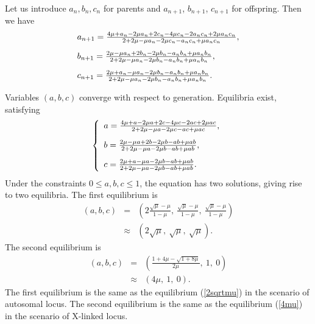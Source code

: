 \documentclass[referee,sn-basic]{sn-jnl}%
\theoremstyle{thmstyleone}%
\theoremstyle{thmstyletwo}%
\theoremstyle{thmstylethree}%
\begin{document}
 Let us introduce $a_n,b_n,c_n$ for parents and $a_{n+1}$, $b_{n+1}$, $c_{n+1}$ for offspring.
Then we have
{\begin{equation}\label{np1} 
 \begin{array}{lll}
\vspace{3mm}
a_{n+1}=\frac{  4 \mu + a_n - 2 \mu a_n + 2 c_n - 4 \mu c_n - 2 a_n c_n + 2 \mu a_n c_n}{2 + 2 \mu - \mu a_n - 2 \mu c_n - a_n c_n + \mu a_n c_n },\\
\vspace{3mm}
b_{n+1}= \frac{ 2 \mu - \mu a_n +2 b_n - 2 \mu b_n - a_n b_n + \mu a_n b_n }{2 + 2 \mu - \mu a_n - 2 \mu b_n - a_n b_n + \mu a_n b_n },\\
c_{n+1}=\frac{2 \mu+ a_n  - \mu a_n - 2 \mu b_n - a_n b_n + \mu a_n b_n}{2 + 2 \mu - \mu a_n - 2 \mu b_n - a_n b_n + \mu a_n b_n }.
  \end{array} 
\end{equation}
}

Variables $(a,b,c)$ converge with respect to generation. Equilibria exist, satisfying
{\begin{equation} 
\left\{
  \begin{array}{lll}
\vspace{3mm}
a=\frac{  4 \mu + a - 2 \mu a + 2 c - 4 \mu c - 2 a c + 2 \mu a c}{2 + 2 \mu - \mu a - 2 \mu c - a c + \mu a c },\\
\vspace{3mm}
b= \frac{ 2 \mu - \mu a +2 b - 2 \mu b - a b + \mu a b }{2 + 2 \mu - \mu a - 2 \mu b - a b + \mu a b },\\
c=\frac{2 \mu+ a  - \mu a - 2 \mu b - a b + \mu a b}{2 + 2 \mu - \mu a - 2 \mu b - a b + \mu a b }.
  \end{array} 
\right.
\end{equation}
}
Under the constraints $0\leq a,b,c\leq 1$, the equation has two solutions, giving rise to two equilibria. The first equilibrium is
\begin{equation}\label{firstsolution} 
	\begin{array}{lll}
	(a,b,c)&=&\left(2\frac{\sqrt{\mu}-\mu}{1-\mu},\ \frac{\sqrt{\mu}-\mu}{1-\mu},\ \frac{\sqrt{\mu}-\mu}{1-\mu}\right)\\
		 &\approx & ( 2\sqrt{\mu},\ \sqrt{\mu},\ \sqrt{\mu}).
	\end{array}
\end{equation}
The second equilibrium is
\begin{equation}\label{secondsolution} 
	\begin{array}{lll}
	(a,b,c)&=&\left(\frac{1+4\mu-\sqrt{1+8\mu}}{2\mu},\ 1,\ 0\right)\\
		 &\approx &( 4\mu,\ 1,\ 0).
	\end{array}
\end{equation}
The first equilibrium is the same as the equilibrium (\ref{2sqrtmu}) in the scenario of autosomal locus. The second equilibrium is the same as the equilibrium (\ref{4mu}) in the scenario of X-linked locus. 
\end{document}
